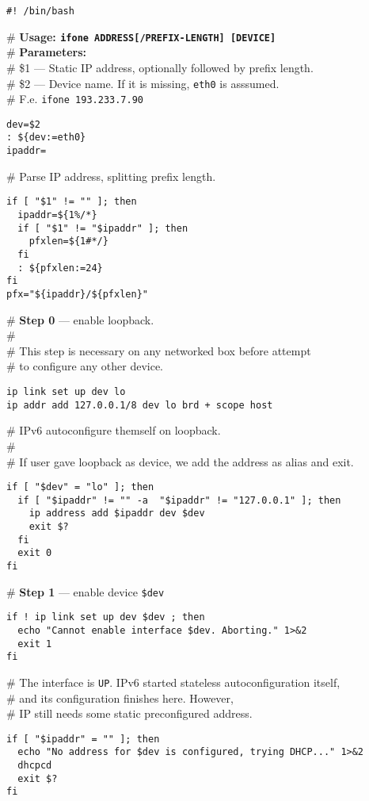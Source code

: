 \begin{verbatim}
#! /bin/bash
\end{verbatim}
\begin{flushleft}
\# {\bf Usage: \verb|ifone ADDRESS[/PREFIX-LENGTH] [DEVICE]|}\\
\# {\bf Parameters:}\\
\# \$1 --- Static IP address, optionally followed by prefix length.\\
\# \$2 --- Device name. If it is missing, \verb|eth0| is asssumed.\\
\# F.e. \verb|ifone 193.233.7.90|
\end{flushleft}
\begin{verbatim}
dev=$2
: ${dev:=eth0}
ipaddr=
\end{verbatim}
\# Parse IP address, splitting prefix length.
\begin{verbatim}
if [ "$1" != "" ]; then
  ipaddr=${1%/*}
  if [ "$1" != "$ipaddr" ]; then
    pfxlen=${1#*/}
  fi
  : ${pfxlen:=24}
fi
pfx="${ipaddr}/${pfxlen}"
\end{verbatim}

\begin{flushleft}
\# {\bf Step 0} --- enable loopback.\\
\#\\
\# This step is necessary on any networked box before attempt\\
\# to configure any other device.\\
\end{flushleft}
\begin{verbatim}
ip link set up dev lo
ip addr add 127.0.0.1/8 dev lo brd + scope host
\end{verbatim}
\begin{flushleft}
\# IPv6 autoconfigure themself on loopback.\\
\#\\
\# If user gave loopback as device, we add the address as alias and exit.
\end{flushleft}
\begin{verbatim}
if [ "$dev" = "lo" ]; then
  if [ "$ipaddr" != "" -a  "$ipaddr" != "127.0.0.1" ]; then
    ip address add $ipaddr dev $dev
    exit $?
  fi
  exit 0
fi
\end{verbatim}

\noindent\# {\bf Step 1} --- enable device \verb|$dev|

\begin{verbatim}
if ! ip link set up dev $dev ; then
  echo "Cannot enable interface $dev. Aborting." 1>&2
  exit 1
fi
\end{verbatim}
\begin{flushleft}
\# The interface is \verb|UP|. IPv6 started stateless autoconfiguration itself,\\
\# and its configuration finishes here. However,\\
\# IP still needs some static preconfigured address.
\end{flushleft}
\begin{verbatim}
if [ "$ipaddr" = "" ]; then
  echo "No address for $dev is configured, trying DHCP..." 1>&2
  dhcpcd
  exit $?
fi
\end{verbatim}

